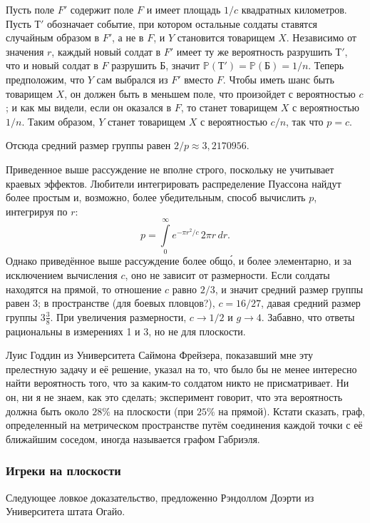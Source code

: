 Пусть поле $F'$ содержит поле $F$ и имеет площадь $1/c$ квадратных километров.
Пусть $\text{Т}'$ обозначает событие, при котором остальные солдаты ставятся случайным образом в $F'$, а не в $F$, и $Y$ становится товарищем $X$.
Независимо от значения $r$, каждый новый солдат в $F'$ имеет ту же вероятность разрушить $\text{Т}'$, что и новый солдат в $F$ разрушить $\text{Б}$, значит $\mathbb{P}(\text{Т}')= \mathbb{P}(\text{Б}) = 1/n$.
Теперь предположим, что $Y$ сам выбрался из $F'$ вместо $F$.
Чтобы иметь шанс быть товарищем $X$, он должен быть в меньшем поле, что произойдет с вероятностью $c$; и как мы видели, если он оказался в $F$, то станет товарищем $X$ с вероятностью $1/n$.
Таким образом, $Y$ станет товарищем $X$ с вероятностью $c/n$, так что $p=c$.

Отсюда средний размер группы равен $2/p\approx3{,}2170956$.
\heart

Приведенное выше рассуждение не вполне строго, поскольку не учитывает краевых эффектов.
Любители интегрировать распределение Пуассона %
найдут более простым и, возможно, более убедительным, способ вычислить $p$, интегрируя по $r$:
\[p=\int\limits_0^\infty e^{-\pi r^2/c}\,2\pi r\, dr.\] %
Однако приведённое выше рассуждение более общ\'{о}, и более элементарно, и за исключением вычисления $c$, оно не зависит от размерности.
Если солдаты находятся на прямой, то отношение $c$ равно $2/3$, и значит средний размер группы равен 3;
в пространстве (для боевых пловцов?), $c = 16/27$, давая средний размер группы $3\tfrac38$.
При увеличения размерности, $c\to 1/2$ и $g\to 4$. 
Забавно, что ответы рациональны в измерениях 1 и 3, но не для плоскости.

Луис Годдин из Университета Саймона Фрейзера, показавший мне эту прелестную задачу и её решение, указал на то, что было бы не менее интересно найти вероятность того, что за каким-то солдатом никто не присматривает.
Ни он, ни я не знаем, как это сделать; эксперимент говорит, что эта вероятность должна быть около $28\%$ на плоскости (при $25\%$ на прямой).
Кстати сказать, граф, определенный на метрическом пространстве путём соединения каждой точки с её ближайшим соседом, иногда называется графом Габриэля.

\subsubsection*{Игреки на плоскости}

Следующее ловкое  доказательство, предложенно Рэндоллом Доэрти из Университета штата Огайо.

